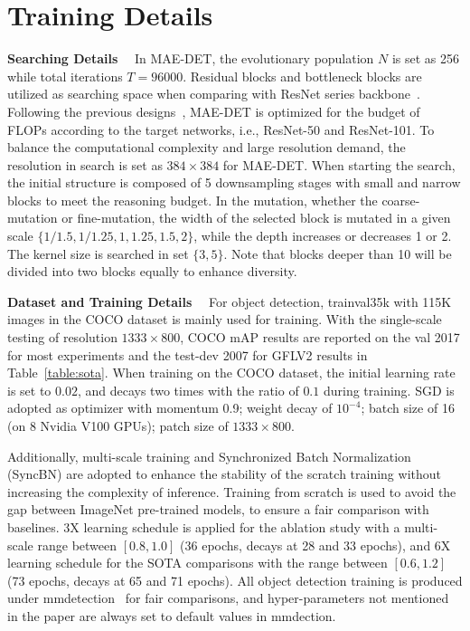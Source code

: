 \documentclass[nohyperref]{article}
\theoremstyle{plain}
\theoremstyle{definition}
\theoremstyle{remark}
\begin{document}
\section{Training Details}\label{app:detail}
\noindent\textbf{Searching Details}$\quad$ 
In MAE-DET, the evolutionary population $N$ is set as 256 while total iterations $T=96000$. 
Residual blocks and bottleneck blocks are utilized as searching space when comparing with ResNet series backbone~\citep{resnet}.
Following the previous designs~\citep{detnas,spnas,spinenet}, MAE-DET is optimized for the budget of FLOPs according to the target networks, i.e., ResNet-50 and ResNet-101.
To balance the computational complexity and large resolution demand, the resolution in search is set as $384\times384$ for MAE-DET.
When starting the search, the initial structure is composed of 5 downsampling stages with small and narrow blocks to meet the reasoning budget. 
In the mutation, whether the coarse-mutation or fine-mutation, the width of the selected block is mutated in a given scale $\{1/1.5, 1/1.25, 1, 1.25, 1.5, 2\}$, while the depth increases or decreases 1 or 2. The kernel size is searched in set $\{3, 5\}$. Note that blocks deeper than 10 will be divided into two blocks equally to enhance diversity.

\noindent\textbf{Dataset and Training Details}$\quad$ 
For object detection, trainval35k with 115K images in the COCO dataset is mainly used for training. 
With the single-scale testing of resolution $1333\times800$, COCO mAP results are reported on the val 2017 for most experiments and the test-dev 2007 for GFLV2 results in Table~\ref{table:sota}.
When training on the COCO dataset, the initial learning rate is set to $0.02$, and decays two times with the ratio of $0.1$ during training. 
SGD is adopted as optimizer with momentum 0.9; weight decay of $10^{-4}$; batch size of 16 (on 8 Nvidia V100 GPUs); patch size of $1333\times800$.

Additionally, multi-scale training and Synchronized Batch Normalization (SyncBN) are adopted to enhance the stability of the scratch training without increasing the complexity of inference.
Training from scratch is used to avoid the gap between ImageNet pre-trained models, to ensure a fair comparison with baselines.
3X learning schedule is applied for the ablation study with a multi-scale range between $[0.8, 1.0]$ (36 epochs, decays at 28 and 33 epochs), and 6X learning schedule for the SOTA comparisons with the range between $[0.6, 1.2]$ (73 epochs, decays at 65 and 71 epochs).
All object detection training is produced under mmdetection~\citep{mmdet} for fair comparisons, and hyper-parameters not mentioned in the paper are always set to default values in mmdection.
\end{document}
